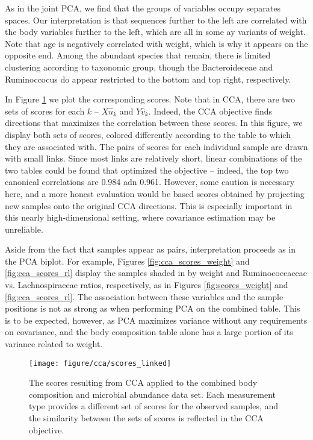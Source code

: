 \documentclass{article}
\begin{document}
As in the joint PCA, we find that the groups of variables occupy separates
spaces. Our interpretation is that sequences further to the left are correlated
with the body variables further to the left, which are all in some ay variants
of weight. Note that age is negatively correlated with weight, which is why it
appears on the opposite end. Among the abundant species that remain, there is
limited clustering according to taxonomic group, though the Bacteroideceae and
Ruminoccocus do appear restricted to the bottom and top right, respectively.

In Figure \ref{fig:cca_scores_linked} we plot the corresponding scores. Note
that in CCA, there are two sets of scores for each $k$ -- $X\hat{u}_{k}$ and
$Y\hat{v}_{k}$. Indeed, the CCA objective finds directions that maximizes the
correlation between these scores. In this figure, we display both sets of
scores, colored differently according to the table to which they are associated
with. The pairs of scores for each individual sample are drawn with small links.
Since most links are relatively short, linear combinations of the two tables
could be found that optimized the objective -- indeed, the top two canonical
correlations are 0.984 adn 0.961. However, some caution is necessary here, and a
more honest evaluation would be based scores obtained by projecting new samples
onto the original CCA directions. This is especially important in this nearly
high-dimensional setting, where covariance estimation may be unreliable.

Aside from the fact that samples appear as pairs, interpretation proceeds as in
the PCA biplot. For example, Figures \ref{fig:cca_scores_weight} and
\ref{fig:cca_scores_rl} display the samples shaded in by weight and
Ruminococcaceae vs. Lachnospiraceae ratios, respectively, as in Figures
\ref{fig:scores_weight} and \ref{fig:cca_scores_rl}. The association between
these variables and the sample positions is not as strong as when performing PCA
on the combined table. This is to be expected, however, as PCA maximizes
variance without any requirements on covariance, and the body composition table
alone has a large portion of its variance related to weight.

\begin{figure}[ht]
  \centering
  \texttt{[image: figure/cca/scores\_linked]}
  \caption{The scores resulting from CCA applied to the combined body
    composition and microbial abundance data set. Each measurement type provides
    a different set of scores for the observed samples, and the similarity
    between the sets of scores is reflected in the CCA
    objective.\label{fig:cca_scores_linked}}
\end{figure}
\end{document}
